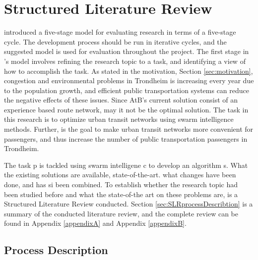 \section{Structured Literature Review}
\label{sec:structuredLiteratureReview}

\citet{cohen88} introduced a five-stage model for evaluating research in terms of a five-stage cycle. The development process should be run in iterative cycles, and the suggested model is used for evaluation throughout the project. The first stage in \citet{cohen88}'s model involves refining the research topic to a task, and identifying a view of how to accomplish the task. %
As stated in the motivation, Section \vref{sec:motivation}, congestion and environmental problems in Trondheim is increasing every year due to the population growth\citep{website:miljopakken}, and efficient public transportation systems can reduce the negative effects of these issues. Since AtB's\citep{website:atb} current solution consist of an experience based route network, may it not be the optimal solution. The task in this research is to optimize urban transit networks using swarm intelligence methods. Further, is the goal to make urban transit networks more convenient for passengers, and thus increase the number of public transportation passengers in Trondheim.%

The task p is tackled using swarm intelligene c to develop an algorithm s. What the existing solutions are available, state-of-the-art. what changes have been done, and has si been combined.  
To establish whether the research topic had been studied before and what the state-of-the art on these problems are, is a Structured Literature Review\citep{kofod2014} conducted. %
Section \vref{sec:SLRprocessDescribtion} is a summary of the conducted literature review, and the complete review can be found in Appendix \vref{appendixA} and Appendix \vref{appendixB}. 

\subsection{Process Description}
\label{sec:SLRprocessDescribtion}

